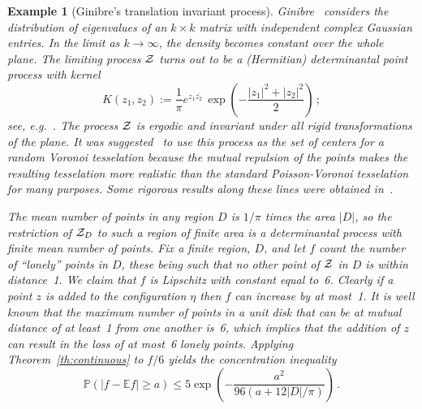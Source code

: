 \documentclass[10pt]{article}
\theoremstyle{plain}
\newtheorem{example}[thm]{Example}
\theoremstyle{remark}
\def\E{{\mathbb E}}
\def\P{{\mathbb P}}
\def\ZZ{{\cal Z}}
\begin{document}
\begin{example}[Ginibre's translation invariant process]
\label{eg:ginibre}
Ginibre~\cite{ginibre65} considers the distribution of eigenvalues
of an $k \times k$ matrix with independent complex Gaussian
entries.  In the limit as $k \to \infty$, the density becomes
constant over the whole plane.  The limiting process $\ZZ$ turns
out to be a (Hermitian) determinantal point process with kernel
$$K(z_1 , z_2) := \frac{1}{\pi} e^{z_1 \overline{z_2}}
   \, \exp \left ( - \frac{|z_1|^2 + |z_2|^2}{2} \right ) \, ;$$
see, e.g.~\cite[(2.16)]{soshnikov00}.  The process $\ZZ$ is
ergodic and invariant under all rigid transformations of the
plane.  It was suggested~\cite{lecaer-ho90} to use this
process as the set of centers for a random Voronoi tesselation
because the mutual repulsion of the points makes the resulting
tesselation more realistic than the standard Poisson-Voronoi
tesselation for many purposes.  Some rigorous results along
these lines were obtained in~\cite{goldman10}.

The mean number of points in any region $D$ is $1/\pi$ times
the area $|D|$, so the restriction of $\ZZ_D$ to such
a region of finite area is a determinantal process with
finite mean number of points.
Fix a finite region, $D$, and let $f$ count the number of ``lonely''
points in $D$, these being such that no other point of $\ZZ$
in $D$ is within distance~1.  We claim that $f$ is Lipschitz
with constant equal to~6.  Clearly if a point $z$ is added
to the configuration $\eta$ then $f$ can increase by
at most~1.  It is well known that the maximum number
of points in a unit disk that can be at mutual distance
of at least~1 from one another is~6, which implies that
the addition of $z$ can result in the loss of at most~6
lonely points.  Applying Theorem~\ref{th:continuous}
to $f/6$ yields the concentration inequality
$$\P (|f - \E f| \geq a) \leq 5 \exp \left (
   - \frac{a^2}{96 (a + 12 |D| / \pi )} \right ) \, .$$
\end{example}
\end{document}
